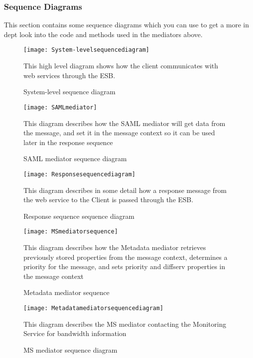     \subsubsection{Sequence Diagrams}\label{Server Sequence Diagrams}
    This section contains some sequence diagrams which you can use to get a more in dept look into the code and methods used in the mediators above.
    
        \begin{figure}[H]
            \centering
            \texttt{[image: System-levelsequencediagram]}
            \caption{System-level sequence diagram}
            This high level diagram shows how the client communicates with web services through the ESB.
            \label{fig:System-levelsequencediagram}
        \end{figure}
        
        \begin{figure}[H]
            \centering
            \texttt{[image: SAMLmediator]}
            \caption{SAML mediator sequence diagram}
            This diagram describes how the SAML mediator will get data from the message, and set it in the message context so it can be used later in the response sequence
            \label{fig:SAMLmediator}
        \end{figure}
        
        \begin{figure}[H]
            \texttt{[image: Responsesequencediagram]}
            \caption{Response sequence sequence diagram}
            This diagram describes in some detail how a response message from the web service to the Client is passed through the ESB.
            \label{fig:Responsesequencediagram}
        \end{figure}
    
        \begin{figure}[H]
            \centering
            \texttt{[image: MSmediatorsequence]}
            \caption{Metadata mediator sequence}
            This diagram describes how the Metadata mediator retrieves previously stored properties from the message context, determines a priority for the message, and sets priority and diffserv properties in the message context
            \label{fig:MSmediatorsequence}
        \end{figure}
        
        \begin{figure}[H]
            \centering
            \texttt{[image: Metadatamediatorsequencediagram]}
            \caption{MS mediator sequence diagram}
            This diagram describes the MS mediator contacting the Monitoring Service for bandwidth information
            \label{fig:Metadatamediatorsequencediagram}
        \end{figure}

